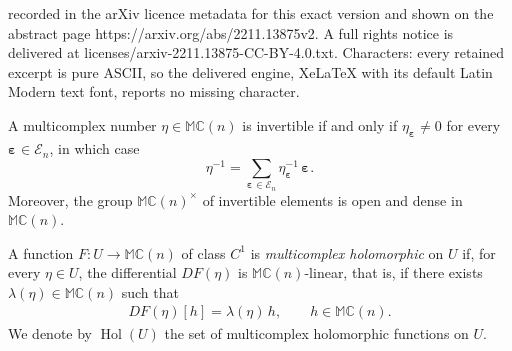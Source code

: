 \documentclass[10pt,a4paper]{amsart}
\DeclareMathOperator{\hol}{Hol}
\newcommand{\bep}[1]{\bm{\varepsilon_{#1}}}
\newcommand{\mC}{\mathbb{C}}
\newcommand{\mM}{\mathbb{M}}
\newcommand{\ra}{\rightarrow}
\begin{document}
recorded in the arXiv licence metadata for this exact version and shown on the abstract page https://arxiv.org/abs/2211.13875v2. A full rights notice is delivered at licenses/arxiv-2211.13875-CC-BY-4.0.txt. Characters: every retained excerpt is pure ASCII, so the delivered engine, XeLaTeX with its default Latin Modern text font, reports no missing character.
    \begin{lemma}\label{L:Invertibility}
    A multicomplex number $\eta \in \mM \mC(n)$ is invertible if and only if
    $\eta_{\bep{}} \neq 0$ for every $\bep{} \in \mathcal{E}_n$, in which case
        \[
        \eta^{-1} = \sum_{\bep{} \in \mathcal{E}_n} \eta_{\bep{}}^{-1}\, \bep{} .
        \]
    Moreover, the group $\mM \mC(n)^\times$ of invertible elements is open and
    dense in $\mM \mC(n)$.
    \end{lemma}

    \begin{definition}\label{D:MCHolo}
    A function $F : U \ra \mM \mC(n)$ of class $C^1$ is \emph{multicomplex holomorphic} on $U$ if, for every $\eta \in U$, the differential $D F (\eta)$ is $\mM \mC(n)$-linear, that is, if there exists $\lambda (\eta ) \in \mM \mC(n)$ such that
        \begin{align*}
        DF (\eta ) [h] = \lambda (\eta )\, h , \qquad h \in \mM \mC(n).
        \end{align*}
    We denote by $\hol(U)$ the set of multicomplex holomorphic functions on $U$.
    \end{definition}
\end{document}
